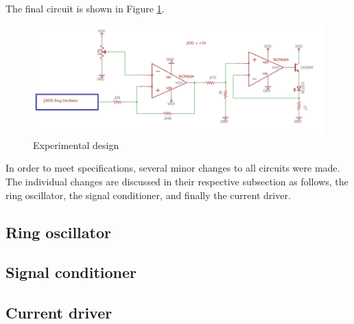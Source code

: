 
The final circuit is shown in Figure \ref{fig:finalexperimentalschem}.

\begin{figure}
	\centering
	\includegraphics[width=0.7\linewidth]{ExperimentalImplementation/FINAlexperimentalSchem}
	\caption[Final circuit]{Experimental design}
	\label{fig:finalexperimentalschem}
\end{figure}

In order to meet specifications, several minor changes to all circuits were made. The individual changes are discussed in their respective subsection as follows, the ring oscillator, the signal conditioner, and finally the current driver.


\subsection{Ring oscillator}



\subsection{Signal conditioner}


\subsection{Current driver}

	
